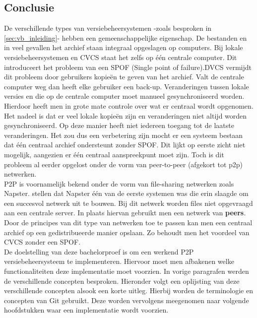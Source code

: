 \subsection{Conclusie}
\label{vb_conclusie}
De verschillende types van versiebeheersystemen -zoals besproken in \ref{sec:vb_inleiding}- hebben een gemeenschappelijke eigenschap. De bestanden en in veel gevallen het archief staan integraal opgeslagen op computers. Bij lokale versiebeheersystemen en CVCS staat het zelfs op één centrale computer. Dit introduceert het probleem van een SPOF (Single point of failure).DVCS vermijdt dit probleem door gebruikers kopieën te geven van het archief. Valt de centrale computer weg dan heeft elke gebruiker een back-up. Veranderingen tussen lokale versies en die op de centrale computer moet manueel gesynchroniseerd worden. Hierdoor heeft men in grote mate controle over wat er centraal wordt opgenomen. Het nadeel is dat er veel lokale kopieën zijn en veranderingen niet altijd worden gesynchroniseerd. Op deze manier heeft niet iedereen toegang tot de laatste veranderingen. Het zou dus een verbetering zijn mocht er een systeem bestaan dat één centraal archief ondersteunt zonder SPOF. Dit lijkt op eerste zicht niet mogelijk, aangezien er één centraal aanspreekpunt moet zijn. Toch is dit probleem al eerder opgelost onder de vorm van peer-to-peer (afgekort tot p2p) netwerken.\\

P2P is voornamelijk bekend onder de vorm van file-sharing netwerken zoals Napster. \textcite{Chawathe2003} stellen dat Napster één van de eerste systemen was die erin slaagde om een succesvol netwerk uit te bouwen. Bij dit netwerk worden files niet opgevraagd aan een centrale server. In plaats hiervan gebruikt men een netwerk van \textbf{peers}. Door de principes van dit type van netwerken toe te passen kan men een centraal archief op een gedistribueerde manier opslaan. Zo behoudt men het voordeel van CVCS zonder een SPOF. \\

De doelstelling van deze bachelorproef is om een werkend P2P versiebeheersysteem te implementeren. Hiervoor moet men afbakenen welke functionaliteiten deze implementatie moet voorzien. In vorige paragrafen werden de verschillende concepten besproken. Hieronder volgt een oplijsting van deze verschillende concepten alsook een korte uitleg. Hierbij worden de terminologie en concepten van Git gebruikt. Deze worden vervolgens meegenomen naar volgende hoofdstukken waar een implementatie wordt voorzien.

